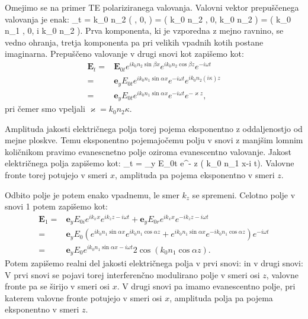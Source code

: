 Omejimo se na primer TE polariziranega valovanja. Valovni
vektor prepuščenega valovanja je enak:
\beq
{}_t = k_0 n_2 \left( \sin \beta, 0, \cos \beta \right) = 
\left( k_0 n_2 \sin \beta, 0, k_0 n_2 \cos \beta \right) = 
\left( k_0 n_1 \sin \alpha, 0, i k_0 n_2 \kappa \right).
\eeq
Prva komponenta, ki je vzporedna z mejno ravnino, se vedno ohranja,
tretja komponenta pa pri velikih vpadnih kotih postane imaginarna.
Prepuščeno valovanje v drugi snovi kot zapišemo kot:
\begin{align}
\mathbf{E}_t =& \mathbf{E}_{0t} e^{i k_0 n_2 \sin \beta x}
 e^{i k_0 n_2 \cos \beta z} e^{-i \omega t} \\
 =& \mathbf{e}_{y} E_{0t}  e^{i k_0 n_1 \sin \alpha x}
 e^{-i \omega t} e^{i k_0 n_2 (i\kappa) z} \\
 =& \mathbf{e}_{y} E_{0t}  e^{i k_0 n_1 \sin \alpha x}
 e^{-i \omega t} e^{- \varkappa z},
\end{align}
pri čemer smo vpeljali $\varkappa = k_0 n_2 \kappa$.

Amplituda jakosti električnega polja torej pojema eksponentno
z oddaljenostjo od mejne ploskve. Temu eksponentno pojemajočemu
polju v snovi z manjšim lomnim količnikom pravimo evanescnetno polje 
oziroma evanescentno valovanje. Jakost električnega polja zapišemo kot:
\beq
{}_t = _{y} E_{0t} e^{- \varkappa z}
\cos \left( k_0 n_1 \sin \alpha x-i \omega t\right). 
\eeq
Valovne fronte torej potujejo v smeri $x$, amplituda pa pojema
eksponentno v smeri $z$. 

Odbito polje je potem enako vpadnemu, le smer $k_z$ se spremeni. 
Celotno polje v snovi 1 potem zapišemo kot:
\begin{align}
\mathbf{E}_1 =& \mathbf{e}_{y} E_{0i} e^{ik_x x}e^{ik_z z -i \omega t} +
\mathbf{e}_{y} E_{0r} e^{ik_x x}e^{-ik_z z -i \omega t} \\
=& \mathbf{e}_{y} E_{0} \left(
e^{ik_0n_1\sin \alpha x}e^{ik_0n_1\cos \alpha z}+
e^{ik_0n_1\sin \alpha x}e^{-ik_0n_1\cos \alpha z}\right) e^{-i \omega t} \\
=& \mathbf{e}_{y} E_{0} e^{ik_0n_1\sin \alpha x-i\omega t} 2 
\cos \left(k_0 n_1\cos \alpha z\right).
\end{align}
Potem zapišemo realni del jakosti električnega polja v prvi snovi:
in v drugi snovi:
V prvi snovi se pojavi torej interferenčno modulirano polje v smeri osi $z$,
valovne fronte pa se širijo v smeri osi $x$.  V drugi snovi pa imamo
evanescentno polje, pri katerem valovne fronte potujejo v smeri osi $x$, 
amplituda polja pa pojema eksponentno v smeri $z$.

